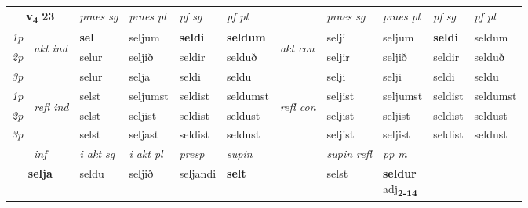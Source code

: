 \noindent
\begin{tabular}{lllllllllll} \toprule
\multicolumn{2}{c}{\textbf{v{\textsubscript{4}}} \Large{\textbf{23}}}  &  \textit{praes sg}  & \textit{praes pl}  &\textit{ pf sg} & \textit{pf pl} &  &  \textit{praes sg}  & \textit{praes pl}  & \textit{pf sg} & \textit{pf pl } \\*
	\cmidrule{3-6} \cmidrule{8-11}
 {\textit{1p}} & \multirow{3}{*}{\begin{turn}{90}\textit{akt ind}\end{turn}} & \textbf{sel} & seljum & \textbf{seldi} & \textbf{seldum} & \multirow{3}{*}{\begin{turn}{90}\textit{akt con}\end{turn}} &selji & seljum & \textbf{seldi} & seldum\\*
 {\textit{2p}} &  &  selur  & seljið & seldir & selduð & & seljir & seljið & seldir & selduð \\*
{\textit{3p}} &  & selur & selja & seldi & seldu & & selji & selji& seldi & seldu \\*
\cmidrule{3-6} \cmidrule{8-11}
 {\textit{1p}} & \multirow{3}{*}{\begin{turn}{90}\textit{refl ind}\end{turn}}  & selst & seljumst & seldist & seldumst & \multirow{3}{*}{\begin{turn}{90}\textit{refl con}\end{turn}}  &seljist & seljumst & seldist & seldumst \\*
 {\textit{2p}} &  & selst & seljist & seldist & seldust & &seljist & seljist & seldist & seldust \\*
 {\textit{3p}}  & & selst & seljast & seldist & seldust & & seljist & seljist& seldist & seldust \\*
\cmidrule{3-6} \cmidrule{8-11}

   \multicolumn{2}{c}{\textit{inf}}  & \textit{i akt sg} & \textit{i akt pl}   & \textit{presp} & \textit{supin} && \textit{supin refl} & \textit{pp m} \\*
  \multicolumn{2}{c}{\textbf{selja}} & seldu  & seljið   & seljandi &  \textbf{selt} && selst & \specialcell{\textbf{seldur} \\ adj\textbf{\textsubscript{2-14}}} \\*
\end{tabular}

